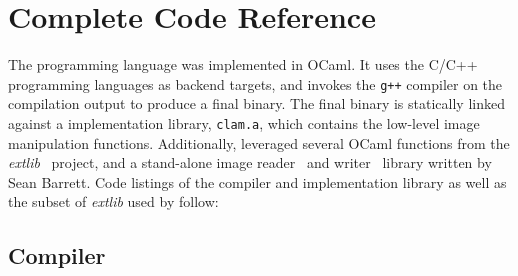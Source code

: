 \chapter{Complete Code Reference}
The \sys{} programming language was implemented in OCaml. It uses the
C/C++ programming languages as backend targets, and invokes the \texttt{g++}
compiler on the \sys{} compilation output to produce a final binary. The
final binary is statically linked against a \sys{} implementation library,
\texttt{clam.a}, which contains the low-level image manipulation functions. Additionally,
\sys{} leveraged several OCaml functions from the \emph{extlib}~\cite{extlib:googlecode}
project, and a stand-alone image reader~\cite{stbimage:read} and writer~\cite{stbimage:write}
library written by Sean Barrett. Code listings of the \sys{} compiler and \sys{} implementation library
as well as the subset of \emph{extlib} used by \sys{} follow:

\clearpage
\section{\sys{} Compiler}
 \clearpage
 \clearpage
 \clearpage
 \clearpage
 \clearpage
 \clearpage
 \clearpage
 \clearpage
 \clearpage
 \clearpage
 \clearpage
 \clearpage
 \clearpage

